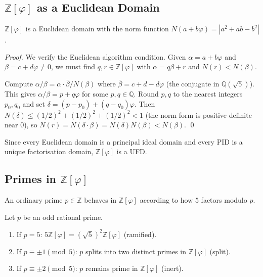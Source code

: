 \subsection{$\mathbb{Z}[\varphi]$ as a Euclidean Domain}

\begin{theorem}\label{thm:euclidean-domain}
  $\mathbb{Z}[\varphi]$ is a Euclidean domain with the norm function
  $N(a+b\varphi) = |a^2 + ab - b^2|$.
\end{theorem}

\begin{proof}
  We verify the Euclidean algorithm condition.  Given
  $\alpha = a + b\varphi$ and $\beta = c + d\varphi \neq 0$, we must
  find $q, r \in \mathbb{Z}[\varphi]$ with $\alpha = q\beta + r$ and
  $N(r) < N(\beta)$.

  Compute $\alpha/\beta = \alpha \cdot \bar{\beta} / N(\beta)$ where
  $\bar{\beta} = c + d - d\varphi$ (the conjugate in $\mathbb{Q}(\sqrt{5})$).
  This gives $\alpha/\beta = p + q\varphi$ for some $p, q \in \mathbb{Q}$.
  Round $p, q$ to the nearest integers $p_0, q_0$ and set
  $\delta = (p - p_0) + (q - q_0)\varphi$.  Then
  $N(\delta) \leq (1/2)^2 + (1/2)^2 + (1/2)^2 < 1$
  (the norm form is positive-definite near $0$), so
  $N(r) = N(\delta \cdot \beta) = N(\delta) N(\beta) < N(\beta)$.
  \qed
\end{proof}

\begin{corollary}\label{cor:ufd}
  Since every Euclidean domain is a principal ideal domain and every
  PID is a unique factorisation domain, $\mathbb{Z}[\varphi]$ is a UFD.
\end{corollary}

\subsection{Primes in $\mathbb{Z}[\varphi]$}

An ordinary prime $p \in \mathbb{Z}$ behaves in $\mathbb{Z}[\varphi]$
according to how $5$ factors modulo $p$.

\begin{proposition}\label{prop:prime-splitting}
  Let $p$ be an odd rational prime.
  \begin{enumerate}
    \item If $p = 5$: $5 \mathbb{Z}[\varphi] = (\sqrt{5})^2 \mathbb{Z}[\varphi]$
      (ramified).
    \item If $p \equiv \pm 1 \pmod{5}$: $p$ splits into two distinct
      primes in $\mathbb{Z}[\varphi]$ (split).
    \item If $p \equiv \pm 2 \pmod{5}$: $p$ remains prime in $\mathbb{Z}[\varphi]$
      (inert).
  \end{enumerate}
\end{proposition}


